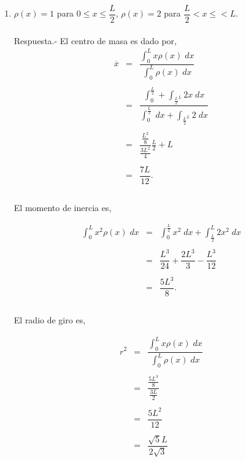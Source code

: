 \begin{enumerate}[\bfseries 1.]
\item $\rho(x)=1$ para $0\leq x \leq \dfrac{L}{2}$, $\rho(x)=2$ para $\dfrac{L}{2}<x\leq<L$.\\\\
    Respuesta.-\;  El centro de masa es dado por,
    $$\begin{array}{rcl}
	\overline{x}&=&\dfrac{\int_0^L x\rho(x)\; dx}{\int_0^L \rho(x)\; dx}\\\\
		    &=&\dfrac{\int_0^{\frac{L}{2}} + \int_{\frac{L}{2}^L}2x\; dx}{\int_0^{\frac{L}{2}}\; dx + \int_{\frac{L}{2}^L}2\; dx}\\\\
		    &=&\dfrac{\frac{L^2}{8}}{\frac{3L^2}{4}}{\frac{L}{2}+L}\\\\
		    &=&\dfrac{7L}{12}.\\\\
    \end{array}$$

    El momento de inercia es,

    $$\begin{array}{rcl}
	\displaystyle\int_0^L x^2 \rho(x)\; dx&=&\displaystyle\int_0^{\frac{L}{2}} x^2\; dx + \displaystyle\int_{\frac{L}{2}}^{L}2x^2\; dx\\\\
					      &=&\dfrac{L^3}{24}+\dfrac{2L^3}{3}-\dfrac{L^3}{12}\\\\
					      &=&\dfrac{5L^3}{8}.\\\\
    \end{array}$$

    El radio de giro es,

    $$\begin{array}{rcl}
	r^2&=&\dfrac{\int_0^L x \rho(x)\; dx}{\int_0^L \rho(x)\; dx}\\\\
	   &=&\dfrac{\frac{5L^3}{8}}{\frac{3L}{2}}\\\\
	   &=&\dfrac{5L^2}{12}\\\\
	   &=&\dfrac{\sqrt{5}L}{2\sqrt{3}}\\\\
    \end{array}$$


\end{enumerate}
